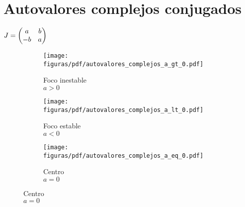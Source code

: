 \documentclass[../ecuaciones_diferenciales.tex]{subfiles}
\begin{document}
\section{Autovalores complejos conjugados}
\(J = \begin{pmatrix}a & b \\ -b & a\end{pmatrix}\)
\begin{figure}[ht]
  \begin{subfigure}{0.33\textwidth}
    \centering
    \texttt{[image: figuras/pdf/autovalores\_complejos\_a\_gt\_0.pdf]}
    \caption*{Foco inestable \\ \(a > 0\)}
  \end{subfigure}%
  \begin{subfigure}{0.33\textwidth}
    \centering
    \texttt{[image: figuras/pdf/autovalores\_complejos\_a\_lt\_0.pdf]}
    \caption*{Foco estable \\ \(a < 0\)}
  \end{subfigure}%
  \begin{subfigure}{0.33\textwidth}
    \centering
    \texttt{[image: figuras/pdf/autovalores\_complejos\_a\_eq\_0.pdf]}
    \caption*{Centro \\ \(a = 0\)}
  \end{subfigure}
\end{figure}
\end{document}
